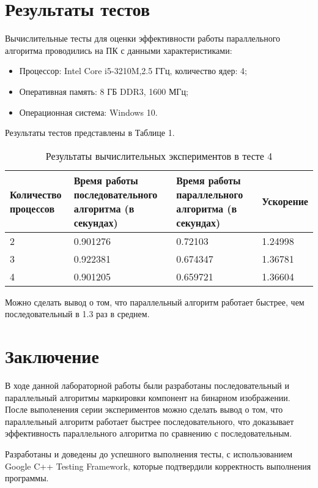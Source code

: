 \documentclass{report}
\begin{document}
\section*{Результаты тестов}
Вычислительные тесты для оценки эффективности работы параллельного алгоритма проводились на ПК с данными характеристиками:
\begin{itemize}
\item Процессор: Intel Core i5-3210M,2.5 ГГц, количество ядер: 4;
\item Оперативная память: 8 ГБ DDR3, 1600  МГц;
\item Операционная система: Windows 10.
\end{itemize}

\par Результаты тестов представлены в Таблице 1.

\begin{table}[!h]
\caption{Результаты вычислительных экспериментов в тесте 4}
\centering
\begin{tabular}{| p{2cm} | p{3cm} | p{4cm} | p{2cm} |}
\hline
Количество процессов & Время работы последовательного алгоритма (в секундах) & Время работы параллельного алгоритма (в секундах) & Ускорение  \\[5pt]
\hline
2        & 0.901276        & 0.72103     & 1.24998       \\
3        & 0.922381        & 0.674347     & 1.36781       \\
4        & 0.901205        & 0.659721     & 1.36604      \\
\hline
\end{tabular}
\end{table}
Можно сделать вывод о том,
что параллельный алгоритм работает быстрее, чем последовательный в 1.3 раз в среднем.

\newpage

\section*{Заключение}
В ходе данной лабораторной работы были разработаны последовательный и параллельный алгоритмы маркировки компонент на бинарном изображении. После выполенения серии экспериментов можно сделать вывод о том, что параллельный алгоритм работает быстрее последовательного, что доказывает эффективность параллельного алгоритма по сравнению с последовательным.
\par Разработаны и доведены до успешного выполнения тесты,  с использованием Google C++ Testing Framework, которые  подтвердили корректность выполнения  программы.
\newpage
\end{document}
